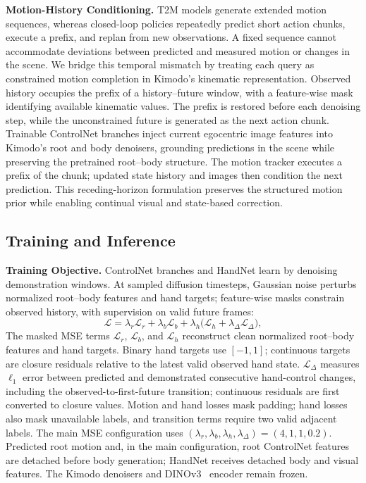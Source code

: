 \textbf{Motion-History Conditioning.} T2M models generate extended motion sequences, whereas closed-loop policies repeatedly predict short action chunks, execute a prefix, and replan from new observations. A fixed sequence cannot accommodate deviations between predicted and measured motion or changes in the scene. We bridge this temporal mismatch by treating each query as constrained motion completion in Kimodo's kinematic representation. Observed history occupies the prefix of a history--future window, with a feature-wise mask identifying available kinematic values. The prefix is restored before each denoising step, while the unconstrained future is generated as the next action chunk. Trainable ControlNet branches inject current egocentric image features into Kimodo's root and body denoisers, grounding predictions in the scene while preserving the pretrained root--body structure. The motion tracker executes a prefix of the chunk; updated state history and images then condition the next prediction. This receding-horizon formulation preserves the structured motion prior while enabling continual visual and state-based correction.

\subsection{Training and Inference}
\label{sec:training_inference}

\textbf{Training Objective.} ControlNet branches and HandNet learn by denoising demonstration windows. At sampled diffusion timesteps, Gaussian noise perturbs normalized root--body features and hand targets; feature-wise masks constrain observed history, with supervision on valid future frames:
\begin{equation}
  \mathcal{L}=\lambda_r\mathcal{L}_{r}+\lambda_b\mathcal{L}_{b}
  +\lambda_h\bigl(\mathcal{L}_{h}+\lambda_{\Delta}\mathcal{L}_{\Delta}\bigr),
  \label{eq:policy_training_objective}
\end{equation}
The masked MSE terms $\mathcal{L}_{r}$, $\mathcal{L}_{b}$, and $\mathcal{L}_{h}$ reconstruct clean normalized root--body features and hand targets. Binary hand targets use $[-1,1]$; continuous targets are closure residuals relative to the latest valid observed hand state. $\mathcal{L}_{\Delta}$ measures $\ell_1$ error between predicted and demonstrated consecutive hand-control changes, including the observed-to-first-future transition; continuous residuals are first converted to closure values. Motion and hand losses mask padding; hand losses also mask unavailable labels, and transition terms require two valid adjacent labels. The main MSE configuration uses $(\lambda_r,\lambda_b,\lambda_h,\lambda_{\Delta})=(4,1,1,0.2)$. Predicted root motion and, in the main configuration, root ControlNet features are detached before body generation; HandNet receives detached body and visual features. The Kimodo denoisers and DINOv3~\cite{dinov3} encoder remain frozen.

